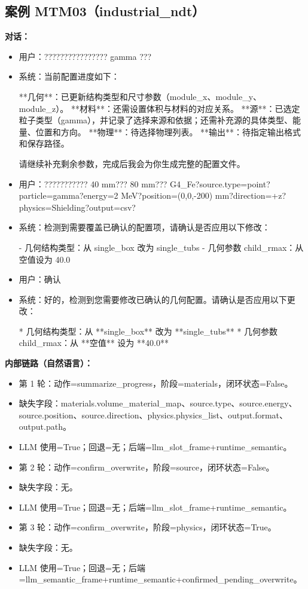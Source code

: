 \documentclass[11pt]{ctexart}
\begin{document}
\subsection{案例 MTM03（industrial\_ndt）}
\textbf{对话：}
\begin{itemize}
\item 用户：???????????????? gamma ???
\item 系统：当前配置进度如下：

**几何**：已更新结构类型和尺寸参数（module\_x、module\_y、module\_z）。  
**材料**：还需设置体积与材料的对应关系。  
**源**：已选定粒子类型（gamma），并记录了选择来源和依据；还需补充源的具体类型、能量、位置和方向。  
**物理**：待选择物理列表。  
**输出**：待指定输出格式和保存路径。

请继续补充剩余参数，完成后我会为你生成完整的配置文件。
\item 用户：??????????? 40 mm??? 80 mm??? G4\_Fe?source.type=point?particle=gamma?energy=2 MeV?position=(0,0,-200) mm?direction=+z?physics=Shielding?output=csv?
\item 系统：检测到需要覆盖已确认的配置项，请确认是否应用以下修改：

- 几何结构类型：从 single\_box 改为 single\_tubs
- 几何参数 child\_rmax：从空值设为 40.0
\item 用户：确认
\item 系统：好的，检测到您需要修改已确认的几何配置。请确认是否应用以下更改：

*   几何结构类型：从 **single\_box** 改为 **single\_tubs**
*   几何参数 child\_rmax：从 **空值** 设为 **40.0**
\end{itemize}
\textbf{内部链路（自然语言）：}
\begin{itemize}
\item 第 1 轮：动作=summarize\_progress，阶段=materials，闭环状态=False。
\item 缺失字段：materials.volume\_material\_map、source.type、source.energy、source.position、source.direction、physics.physics\_list、output.format、output.path。
\item LLM 使用=True；回退=无；后端=llm\_slot\_frame+runtime\_semantic。
\item 第 2 轮：动作=confirm\_overwrite，阶段=source，闭环状态=False。
\item 缺失字段：无。
\item LLM 使用=True；回退=无；后端=llm\_slot\_frame+runtime\_semantic。
\item 第 3 轮：动作=confirm\_overwrite，阶段=physics，闭环状态=True。
\item 缺失字段：无。
\item LLM 使用=True；回退=无；后端=llm\_semantic\_frame+runtime\_semantic+confirmed\_pending\_overwrite。
\end{itemize}
\end{document}

